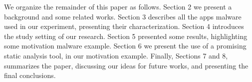 We organize the remainder of this paper as follows. Section 2 we present a background and some related works. Section 3 describes all the apps malware used in our experiment, presenting their characterization. Section 4 introduces the study setting of our research. Section 5 presented some results, highlighting some motivation malware example. Section 6 we present the use of a promising static analysis tool, in our motivation example. Finally, Sections 7 and 8, summarizes the paper, discussing our ideas for future works, and presenting the final conclusions.
 


